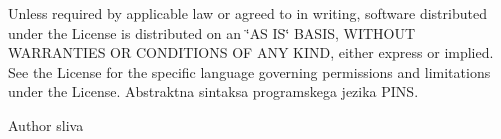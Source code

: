Unless required by applicable law or agreed to in writing, software distributed under the License is distributed on an \char`\"{}\+A\+S I\+S\char`\"{} B\+A\+S\+IS, W\+I\+T\+H\+O\+UT W\+A\+R\+R\+A\+N\+T\+I\+ES OR C\+O\+N\+D\+I\+T\+I\+O\+NS OF A\+NY K\+I\+ND, either express or implied. See the License for the specific language governing permissions and limitations under the License. Abstraktna sintaksa programskega jezika P\+I\+NS.

\begin{DoxyAuthor}{Author}
sliva 
\end{DoxyAuthor}
